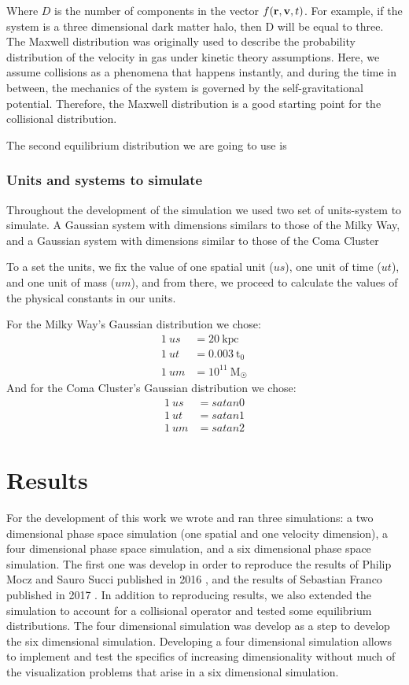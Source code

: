 Where $D$ is the number of components in the vector $\f$. For example, if the system is a three dimensional dark matter halo, then D will be equal to three.
The Maxwell distribution was originally used to describe the probability distribution of the velocity in gas under kinetic theory assumptions. Here, we assume collisions as a phenomena that happens instantly, and during the time in between, the mechanics of the system is governed by the self-gravitational potential. Therefore, the Maxwell distribution is a good starting point for the collisional distribution.

The second equilibrium distribution we are going to use is %


\subsection{Units and systems to simulate}

Throughout the development of the simulation we used two set of units-system to simulate. A Gaussian system with dimensions similars to those of the Milky Way, and a Gaussian system with dimensions similar to those of the Coma Cluster %

To a set the units, we fix the value of one spatial unit ($us$), one unit of time ($ut$), and one unit of mass ($um$), and from there, we proceed to calculate the values of the physical constants in our units.

For the Milky Way's Gaussian distribution we chose:
\begin{align}
1\ us &= 20\ \text{kpc}\\
1\ ut &= 0.003 \ \text{t}_0\\
1\ um &= 10^{11} \ \text{M}_{\astrosun}
\end{align}
And for the Coma Cluster's Gaussian distribution we chose:
\begin{align}
1\ us &= satan0\\
1\ ut &= satan1\\
1\ um &= satan2
\end{align}


\chapter{Results}
For the development of this work we wrote and ran three simulations: a  two dimensional phase space simulation (one spatial and one velocity dimension), a four dimensional phase space simulation, and a six dimensional phase space simulation. 
The first one was develop in order to reproduce the results of Philip Mocz and Sauro Succi published in 2016 \cite{integerLatticeDynamics}, and the results of Sebastian Franco published in 2017 \cite{franco}.
In addition to reproducing results, we also extended the simulation to account for a collisional operator and tested some equilibrium distributions.
The four dimensional simulation was develop as a step to develop the six dimensional simulation. Developing a four dimensional simulation allows to implement and test the specifics of increasing dimensionality without much of the visualization problems that arise in a six dimensional simulation.


